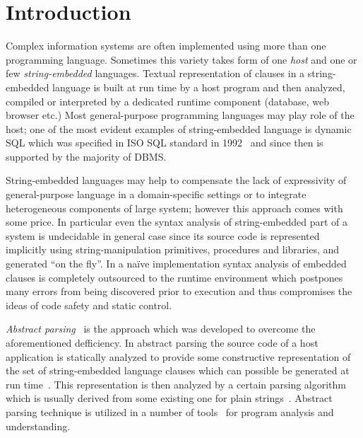 \section{Introduction}

Complex information systems are often implemented using more than one programming language. 
Sometimes this variety takes form of one \emph{host} and one or few \emph{string-embedded}
languages. Textual representation of clauses in a string-embedded language is built at 
run time by a host program and then analyzed, compiled or interpreted by a dedicated 
runtime component (database, web browser etc.) Most general-purpose programming languages 
may play role of the host; one of the most evident examples of string-embedded language is 
dynamic SQL which was specified in ISO SQL standard in 1992~\cite{ISO} and since then is 
supported by the majority of DBMS. 



String-embedded languages may help to compensate the lack of expressivity of general-purpose
language in a domain-specific settings or to integrate heterogeneous components of large system;
however this approach comes with some price. In particular even the syntax analysis of 
string-embedded part of a system is undecidable in general case since its source code
is represented implicitly using string-manipulation primitives, procedures and libraries, and
generated ``on the fly''. In a na\"ive implementation syntax analysis of embedded clauses is
completely outsourced to the runtime environment which postpones many errors from being 
discovered prior to execution and thus compromises the ideas of code safety and static control.

\emph{Abstract parsing}~\cite{AbstrParsing} is the approach which was developed to overcome the 
aforementioned defficiency. In abstract parsing the source code of a host application is statically 
analyzed to provide some constructive representation of the set of string-embedded language clauses which
can possible be generated at run time~\cite{StringExpr,SAofStrVal}. This representation is then analyzed 
by a certain parsing algorithm which is usually derived from some existing one for plain strings~\cite{Grune}.
Abstract parsing technique is utilized in a number of tools~\cite{JSA,PHPSA,ALVOR1,ALVOR2} for
program analysis and understanding.

